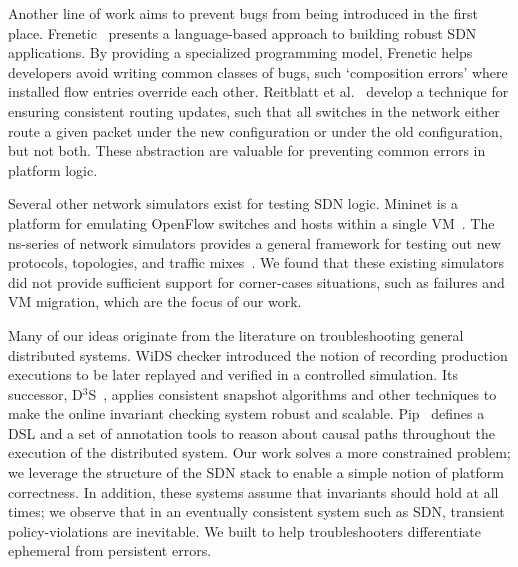 Another line of work aims to prevent bugs from being introduced in the first
place. Frenetic~\cite{frenetic} presents a language-based approach to building
robust SDN applications. By providing a specialized programming model,
 Frenetic helps developers avoid writing common classes of
bugs, such `composition errors' where installed flow entries override each other.
Reitblatt et al.~\cite{consistentupdates} develop a technique for ensuring
consistent routing updates, such that all switches in the network either route
a given packet under the new configuration or under the old configuration,
but not both. These abstraction are valuable for preventing common errors
in platform logic.

Several other network simulators exist for testing SDN logic. Mininet is a 
platform for emulating OpenFlow switches and hosts within a single
 VM~\cite{Lantz:2010:NLR:1868447.1868466}. The ns-series of network simulators
provides a general framework for testing out new protocols, topologies,
and traffic mixes~\cite{ns3}. We found that these existing simulators did
not provide sufficient support for corner-cases situations, such as failures and
VM migration, which are the focus of our work.


Many of our ideas originate from the literature on troubleshooting general
distributed systems. WiDS checker introduced the notion of recording
production executions to be later replayed and verified in a controlled simulation.
Its successor, D$^3$S~\cite{d3s}, applies consistent snapshot algorithms and
other techniques to make the online invariant checking system robust and
scalable. Pip~\cite{pip} defines a DSL and a set of annotation tools to
reason about causal paths throughout the execution of the
distributed system. Our work solves a more constrained problem; we leverage
the structure of the SDN stack to enable a simple notion of platform
correctness. In addition, these systems assume that invariants should hold at
all times; we observe that in an eventually consistent system such as SDN,
transient policy-violations are inevitable. We built \simulator to help troubleshooters
differentiate ephemeral from persistent errors.


